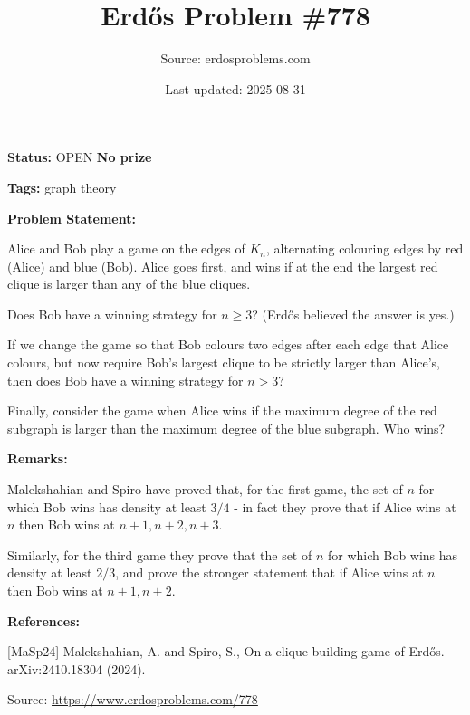 \documentclass{article}
\title{Erd\H{o}s Problem \#778}
\date{Last updated: 2025-08-31}
\author{Source: erdosproblems.com}
\begin{document}
\maketitle

\noindent\textbf{Status:} OPEN \quad \textbf{No prize}

\noindent\textbf{Tags:} graph theory

\medskip
\noindent\textbf{Problem Statement:}

Alice and Bob play a game on the edges of $K_n$, alternating colouring edges by red (Alice) and blue (Bob). Alice goes first, and wins if at the end the largest red clique is larger than any of the blue cliques.

Does Bob have a winning strategy for $n\geq 3$? (Erd\H{o}s believed the answer is yes.)

If we change the game so that Bob colours two edges after each edge that Alice colours, but now require Bob's largest clique to be strictly larger than Alice's, then does Bob have a winning strategy for $n>3$?

Finally, consider the game when Alice wins if the maximum degree of the red subgraph is larger than the maximum degree of the blue subgraph. Who wins?

\bigskip
\noindent\textbf{Remarks:}

Malekshahian and Spiro \cite{MaSp24} have proved that, for the first game, the set of $n$ for which Bob wins has density at least $3/4$ - in fact they prove that if Alice wins at $n$ then Bob wins at $n+1,n+2,n+3$. 

Similarly, for the third game they prove that the set of $n$ for which Bob wins has density at least $2/3$, and prove the stronger statement that if Alice wins at $n$ then Bob wins at $n+1,n+2$.

\bigskip
\noindent\textbf{References:}

[MaSp24] Malekshahian, A. and Spiro, S., On a clique-building game of Erd\H{o}s. arXiv:2410.18304 (2024).

\bigskip
\noindent\small{Source: \url{https://www.erdosproblems.com/778}}
\end{document}
